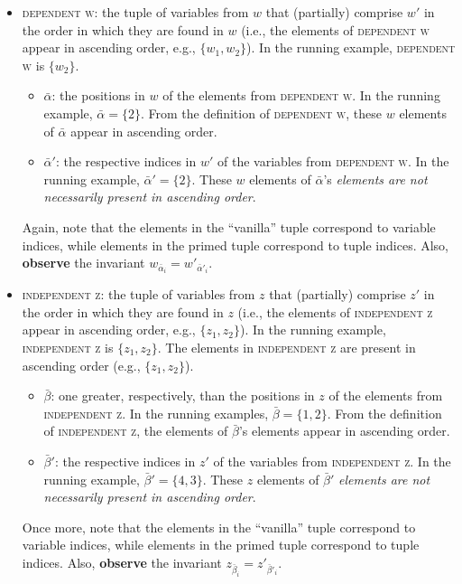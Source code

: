 \documentclass{article}
\newcommand{\1}{(\textos{1})\!}
\newcommand{\2}{(\textos{2})\!}
\newcommand{\3}{(\textos{3})\!}
\newcommand{\4}{(\textos{4})\!}
\newcommand{\5}{(\textos{5})\!}
\newcommand{\6}{(\textos{6})\!}
\newcommand{\7}{(\textos{7})\!}
\newcommand{\8}{(\textos{8})\!}
\begin{document}
\begin{itemize}
	\item \textsc{dependent w}: the tuple of variables from $w$ that (partially) comprise $w'$ in the order in which they are found in $w$ (i.e., the elements of \textsc{dependent w} appear in ascending order, e.g., $\{ w_1, w_2 \}$). In the running example, \textsc{dependent w} is $\{ w_2 \}$.
		\begin{itemize}
			\item $\bar{\alpha}$: the positions in $w$ of the elements from \textsc{dependent w}. In the running example, $\bar{\alpha} = \{ 2 \}$. From the definition of \textsc{dependent w}, these $w$ elements of $\bar{\alpha}$ appear in ascending order.
			\item $\bar{\alpha}'$: the respective indices in $w'$ of the variables from \textsc{dependent w}. In the running example, $\bar{\alpha}' = \{ 2 \}$. These $w$ elements of $\bar{\alpha}$'s \emph{elements are not necessarily present in ascending order}.
		\end{itemize}
		Again, note that the elements in the ``vanilla'' tuple correspond to variable indices, while elements in the primed tuple correspond to tuple indices. Also, \textbf{observe} the invariant $w_{\bar{\alpha}_i} = w'_{\bar{\alpha}'_i}$.
	\item \textsc{independent z}: the tuple of variables from $z$ that (partially) comprise $z'$ in the order in which they are found in $z$ (i.e., the elements of \textsc{independent z} appear in ascending order, e.g., $\{ z_1, z_2 \}$). In the running example, \textsc{independent z} is $\{ z_1, z_2 \}$. The elements in \textsc{independent z} are present in ascending order (e.g., $\{ z_1, z_2 \}$).
		\begin{itemize}
			\item $\bar{\beta}$: one greater, respectively, than the positions in $z$ of the elements from \textsc{independent z}. In the running examples, $\bar{\beta} = \{1, 2 \}$. From the definition of \textsc{independent z}, the elements of $\bar{\beta}$'s elements appear in ascending order.
			\item $\bar{\beta}'$: the respective indices in $z'$ of the variables from \textsc{independent z}. In the running example, $\bar{\beta}' = \{4, 3 \}$. These $z$ elements of $\bar{\beta}'$ \emph{elements are not necessarily present in ascending order}.
		\end{itemize}
		Once more, note that the elements in the ``vanilla'' tuple correspond to variable indices, while elements in the primed tuple correspond to tuple indices. Also, \textbf{observe} the invariant $z_{\bar{\beta}_i} = z'_{\bar{\beta}'_i}$.
\end{itemize}
\end{document}
